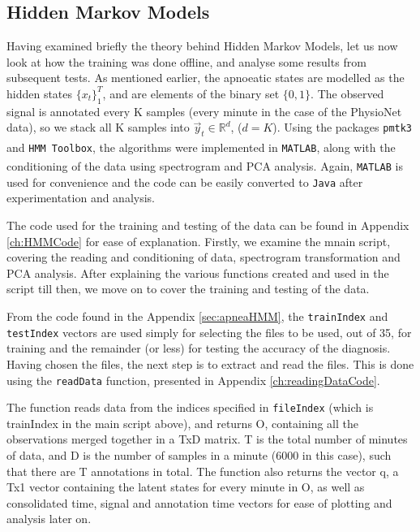 \subsection{Hidden Markov Models}
\label{sec:hmmExperiments-sachin}

Having examined briefly the theory behind Hidden Markov Models, let us now look at how the training was done offline, and analyse some results from subsequent tests. As mentioned earlier, the apnoeatic states are modelled as the hidden states $\{x_t\}_1^T$, and are elements of the binary set $\{0, 1\}$. The observed signal is annotated every K samples (every minute in the case of the PhysioNet data), so we stack all K samples into $\vec y_t \in \mathbb{R}^d$, ($d = K$). Using the packages \verb!pmtk3! and \verb!HMM Toolbox!, the algorithms were implemented in \verb!MATLAB!\textsuperscript{\textregistered}, along with the conditioning of the data using spectrogram and PCA analysis. Again, \verb!MATLAB!\textsuperscript{\textregistered} is used for convenience and the code can be easily converted to \verb!Java! after experimentation and analysis.

The code used for the training and testing of the data can be found in Appendix \ref{ch:HMMCode} for ease of explanation. Firstly, we examine the mnain script, covering the reading and conditioning of data, spectrogram transformation and PCA analysis. After explaining the various functions created and used in the script till then, we move on to cover the training and testing of the data.

From the code found in the Appendix \ref{sec:apneaHMM}, the \verb!trainIndex! and \verb!testIndex! vectors are used simply for selecting the files to be used, out of 35, for training and the remainder (or less) for testing the accuracy of the diagnosis. Having chosen the files, the next step is to extract and read the files. This is done using the \verb!readData! function, presented in Appendix \ref{ch:readingDataCode}.

The function reads data from the indices specified in \verb!fileIndex! (which is trainIndex in the main script above), and returns O, containing all the observations merged together in a TxD matrix. T is the total number of minutes of data, and D is the number of samples in a minute (6000 in this case), such that there are T annotations in total. The function also returns the vector q, a Tx1 vector containing the latent states for every minute in O, as well as consolidated time, signal and annotation time vectors for ease of plotting and analysis later on.

